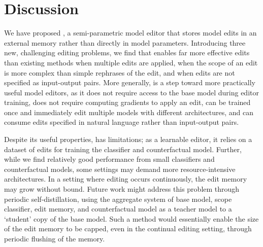 \documentclass{article}
\begin{document}


\section{Discussion}

We have proposed {\name}, a semi-parametric model editor that stores model edits in an external memory rather than directly in model parameters. Introducing three new, challenging editing problems, we find that {\name} enables far more effective edits than existing methods when multiple edits are applied, when the scope of an edit is more complex than simple rephrases of the edit, and when edits are not specified as input-output pairs. More generally, {\name} is a step toward more practically useful model editors, as it does not require access to the base model during editor training, does not require computing gradients to apply an edit, can be trained once and immediately edit multiple models with different architectures, and can consume edits specified in natural language rather than input-output pairs.

Despite its useful properties, {\name} has limitations; as a learnable editor, it relies on a dataset of edits for training the classifier and counterfactual model. Further, while we find relatively good performance from small classifiers and counterfactual models, some settings may demand more resource-intensive architectures. In a setting where editing occurs continuously, the edit memory may grow without bound. Future work might address this problem through periodic self-distillation, using the aggregate system of base model, scope classifier, edit memory, and counterfactual model as a teacher model to a `student' copy of the base model. Such a method would essentially enable the size of the edit memory to be capped, even in the continual editing setting, through periodic flushing of the memory.
\end{document}
